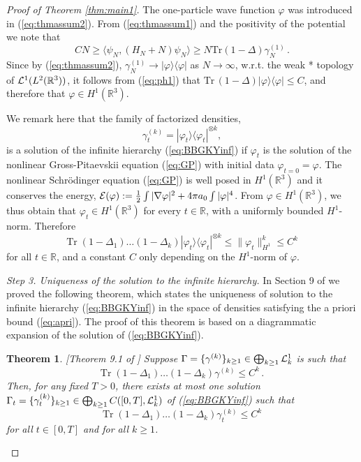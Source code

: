 \documentclass[11pt]{article}
\newtheorem{theorem}{Theorem}[section]
\newcommand{\ph}{\varphi}
\newcommand{\bR}{{\mathbb R}}
\newcommand{\tr}{\mbox{Tr}}
\newcommand{\cE}{{\cal E}}
\newcommand{\cL}{{\cal L}}
\begin{document}
\begin{proof}[Proof of Theorem \ref{thm:main1}]
The one-particle wave function $\ph$ was introduced in
(\ref{eq:thmassum2}). {F}rom (\ref{eq:thmassum1}) and the positivity
of the potential we note that
\begin{equation}\label{eq:ph1}
C N \geq \langle \psi_N, \left(H_N +N \right) \psi_N \rangle \geq N
\tr \left(1 - \Delta \right) \gamma^{(1)}_{N}\,.
\end{equation}
Since by (\ref{eq:thmassum2}), $\gamma^{(1)}_N \to |\ph\rangle
\langle \ph|$ as $N \to \infty$, w.r.t. the weak * topology of
$\cL^1 (L^2 (\bR^{3}))$, it follows from (\ref{eq:ph1}) that $\tr \,
(1-\Delta) |\ph \rangle \langle \ph | \leq C$, and therefore that
$\ph \in H^1 (\bR^3)$.

We remark here that
the family of factorized densities,
\begin{equation}
\label{eq:factsol} \gamma^{(k)}_t = |\ph_t \rangle \langle
\ph_t|^{\otimes k},
\end{equation}
is a solution of the infinite hierarchy (\ref{eq:BBGKYinf}) if
$\ph_t$ is the solution of the nonlinear Gross-Pitaevskii equation
(\ref{eq:GP}) with initial data $\ph_{t=0}= \ph$. The nonlinear
Schr\"odinger equation (\ref{eq:GP}) is well posed in $H^1 (\bR^3)$
and it conserves the energy, $\cE (\ph) := \frac{1}{2} \int |\nabla
\ph|^2 + 4 \pi a_0 \int |\ph|^4$.
{F}rom $\ph \in H^1 (\bR^3)$, we thus
obtain that $\ph_t \in H^1 (\bR^3)$ for every $t \in \bR$, with a
uniformly bounded $H^1$-norm. Therefore
\begin{equation}\label{eq:phik}
\tr \; (1-\Delta_1) \dots (1-\Delta_k) |\ph_t \rangle \langle
\ph_t|^{\otimes k} \leq \| \ph_t \|_{H^1}^k \leq C^k
\end{equation}
for all $t \in \bR$, and a constant $C$ only depending on the
$H^1$-norm of $\ph$.

\medskip

{\it Step 3. Uniqueness of the solution to the infinite hierarchy.}
In Section 9 of \cite{ESY2} we proved the following theorem, which
states the uniqueness of solution to the infinite hierarchy
(\ref{eq:BBGKYinf}) in the space of densities satisfying the a
priori bound (\ref{eq:apri}). The proof of this theorem is based on
a diagrammatic expansion of the solution of (\ref{eq:BBGKYinf}).
\begin{theorem}\label{thm:uniqueness}[Theorem 9.1 of \cite{ESY2}]
Suppose $\Gamma = \{ \gamma^{(k)} \}_{k \geq 1} \in \bigoplus_{k
\geq 1} \cL^1_k$ is such that
\begin{equation}
\tr\; (1-\Delta_1) \dots (1-\Delta_k) \gamma^{(k)} \leq C^k \, .
\end{equation}
Then, for any fixed $T >0$, there exists at most one solution
$\Gamma_t = \{ \gamma^{(k)}_t \}_{k \geq 1} \in \bigoplus_{k \geq 1}
C([0,T], \cL^1_k)$ of (\ref{eq:BBGKYinf}) such that
\begin{equation}\label{eq:bougam}
\tr\; (1-\Delta_1) \dots (1-\Delta_k) \gamma^{(k)}_t \leq C^k
\end{equation}
for all $t \in [0,T]$ and for all $k \geq 1$.
\end{theorem}


\end{proof}
\end{document}
